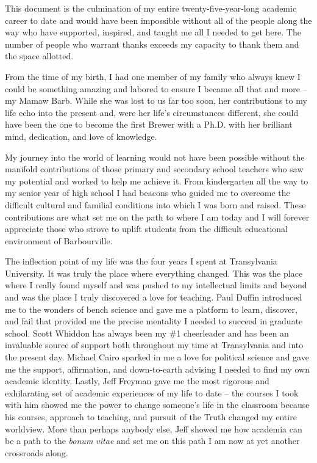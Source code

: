 \documentclass[PhD]{dukethesis2006}
\begin{document}
\begin{doublespace}

This document is the culmination of my entire twenty-five-year-long academic career to date and would have been impossible without all of the people along the way who have supported, inspired, and taught me all I needed to get here. The number of people who warrant thanks exceeds my capacity to thank them and the space allotted. 

From the time of my birth, I had one member of my family who always knew I could be something amazing and labored to ensure I became all that and more -- my Mamaw Barb. While she was lost to us far too soon, her contributions to my life echo into the present and, were her life's circumstances different, she could have been the one to become the first Brewer with a Ph.D. with her brilliant mind, dedication, and love of knowledge.

My journey into the world of learning would not have been possible without the manifold contributions of those primary and secondary school teachers who saw my potential and worked to help me achieve it. From kindergarten all the way to my senior year of high school I had beacons who guided me to overcome the difficult cultural and familial conditions into which I was born and raised. These contributions are what set me on the path to where I am today and I will forever appreciate those who strove to uplift students from the difficult educational environment of Barbourville.

The inflection point of my life was the four years I spent at Transylvania University. It was truly the place where everything changed. This was the place where I really found myself and was pushed to my intellectual limits and beyond and was the place I truly discovered a love for teaching. Paul Duffin introduced me to the wonders of bench science and gave me a platform to learn, discover, and fail that provided me the precise mentality I needed to succeed in graduate school. Scott Whiddon has always been my \#1 cheerleader and has been an invaluable source of support both throughout my time at Transylvania and into the present day. Michael Cairo sparked in me a love for political science and gave me the support, affirmation, and down-to-earth advising I needed to find my own academic identity. Lastly, Jeff Freyman gave me the most rigorous and exhilarating set of academic experiences of my life to date -- the courses I took with him showed me the power to change someone's life in the classroom because his courses, approach to teaching, and pursuit of the Truth changed my entire worldview. More than perhaps anybody else, Jeff showed me how academia can be a path to the \textit{bonum vitae} and set me on this path I am now at yet another crossroads along.


\end{doublespace}
\end{document}

